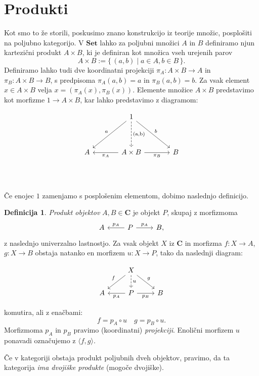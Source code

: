 \documentclass[12pt,a4paper]{book}
\theoremstyle{definition}
\newtheorem{definicija}{Definicija}[chapter]
\theoremstyle{plain}
\theoremstyle{definition}
\theoremstyle{remark}
\newcommand{\cat}[1]{\textbf{#1}}
\renewcommand{\set}[1]{\{\,#1\,\}}
\begin{document}
\section{Produkti}
Kot smo to že storili, poskusimo znano konstrukcijo iz teorije množic, posplošiti na poljubno kategorijo. V $\cat{Set}$ lahko za poljubni množici $A$ in $B$ definiramo njun kartezični produkt $A \times B$, ki je definiran kot množica vseh urejenih parov 
$$A \times B := \set{(a,b) \mid a \in A, b \in B}.$$
Definiramo lahko tudi dve koordinatni projekciji $\pi_A : A\times B \to A$ in $\pi_B : A \times B \to B$, s predpisoma $\pi_A(a,b) = a$ in $\pi_B(a,b) = b$. Za vsak element $x \in A \times B$ velja $x = (\pi_A(x), \pi_B(x))$. Elemente množice $A \times B$ predstavimo kot morfizme $1 \to A \times B$, kar lahko predstavimo z diagramom:

$$ \begin{tikzcd}[row sep=huge, column sep=large]
&  1 \ar[dl, "a"'] \ar[d, dashed, "\text{(a,b)}", font=\large] \ar[dr, "b"] & \\
A & \ar[l, "\pi_A"] A \times B \ar[r, "\pi_B"'] & B \\
\end{tikzcd} $$

Če enojec $1$ zamenjamo s posplošenim elementom, dobimo naslednjo definicijo.

\begin{definicija}
\emph{Produkt objektov} $A,B \in \cat{C}$ je objekt $P$, skupaj z morfizmoma
$$\begin{tikzcd}
A & P \ar[l, "p_A"'] \ar[r, "p_A"] & B,
\end{tikzcd}$$
z naslednjo univerzalno lastnostjo. Za vsak objekt $X$ iz $\cat{C}$ in morfizma $f : X \to A$, $g : X \to B$ obstaja natanko en morfizem $u : X \to P$, tako da naslednji diagram:

$$\begin{tikzcd}
& X \ar[ld, "f"'] \ar[d, dashed, "u"] \ar[rd, "g"] & \\
A & P \ar[l, "p_A"] \ar[r, "p_B"'] & B
\end{tikzcd}$$

komutira, ali z enačbami:
$$f = p_A \circ u \quad g = p_B \circ u.$$
Morfizmoma $p_A$ in $p_B$ pravimo (koordinatni) \textit{projekciji}. Enolični morfizem $u$ ponavadi označujemo z $\langle f,g \rangle$.
\end{definicija}

Če v kategoriji obstaja produkt poljubnih dveh objektov, pravimo, da ta kategorija \textit{ima dvojiške produkte} (mogoče dvojiške).
\end{document}
